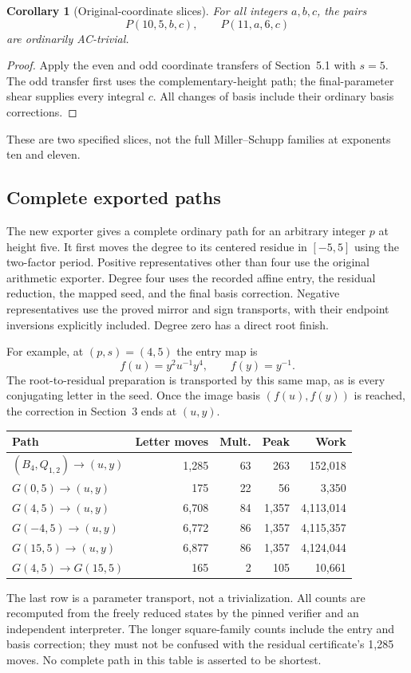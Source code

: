 \documentclass[11pt]{article}
\newtheorem{corollary}[theorem]{Corollary}
\theoremstyle{definition}\newtheorem{definition}[theorem]{Definition}
\theoremstyle{remark}\newtheorem{remark}[theorem]{Remark}
\begin{document}
\begin{corollary}[Original-coordinate slices]\label{cor:h5original}
For all integers $a,b,c$, the pairs
\[
P(10,5,b,c),\qquad P(11,a,6,c)
\]
are ordinarily AC-trivial.
\end{corollary}
\begin{proof}
Apply the even and odd coordinate transfers of Section~5.1 with $s=5$. The odd transfer first uses the complementary-height path; the final-parameter shear supplies every integral $c$. All changes of basis include their ordinary basis corrections.
\end{proof}
These are two specified slices, not the full Miller--Schupp families at exponents ten and eleven.

\subsection{Complete exported paths}
The new exporter gives a complete ordinary path for an arbitrary integer $p$ at height five. It first moves the degree to its centered residue in $[-5,5]$ using the two-factor period. Positive representatives other than four use the original arithmetic exporter. Degree four uses the recorded affine entry, the residual reduction, the mapped seed, and the final basis correction. Negative representatives use the proved mirror and sign transports, with their endpoint inversions explicitly included. Degree zero has a direct root finish.

For example, at $(p,s)=(4,5)$ the entry map is
\[
f(u)=y^2u^{-1}y^4,\qquad f(y)=y^{-1}.
\]
The root-to-residual preparation is transported by this same map, as is every conjugating letter in the seed. Once the image basis $(f(u),f(y))$ is reached, the correction in Section~3 ends at $(u,y)$.

\begin{center}
\small
\begin{tabular}{@{}lrrrr@{}}
\toprule
Path & Letter moves & Mult. & Peak & Work\\
\midrule
$(B_4,Q_{1,2})\to(u,y)$ & 1,285 & 63 & 263 & 152,018\\
$G(0,5)\to(u,y)$ & 175 & 22 & 56 & 3,350\\
$G(4,5)\to(u,y)$ & 6,708 & 84 & 1,357 & 4,113,014\\
$G(-4,5)\to(u,y)$ & 6,772 & 86 & 1,357 & 4,115,357\\
$G(15,5)\to(u,y)$ & 6,877 & 86 & 1,357 & 4,124,044\\
$G(4,5)\to G(15,5)$ & 165 & 2 & 105 & 10,661\\
\bottomrule
\end{tabular}
\end{center}
The last row is a parameter transport, not a trivialization. All counts are recomputed from the freely reduced states by the pinned verifier and an independent interpreter. The longer square-family counts include the entry and basis correction; they must not be confused with the residual certificate's 1,285 moves. No complete path in this table is asserted to be shortest.
\end{document}
